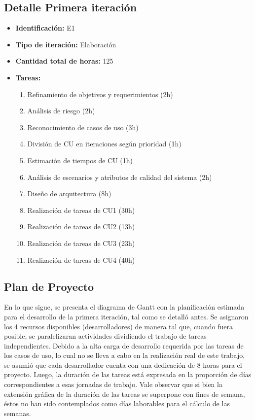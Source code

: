 \documentclass[a4paper, 10pt, twoside]{article}
\begin{document}
\subsection{Detalle Primera iteración}
\begin{itemize}
  \item \textbf{Identificación:} E1
  \item \textbf{Tipo de iteración:} Elaboración
  \item \textbf{Cantidad total de horas:} 125
  \item \textbf{Tareas:}
\begin{enumerate}
  \item Refinamiento de objetivos y requerimientos (2h)
  \item Análisis de riesgo (2h)
  \item Reconocimiento de casos de uso (3h)
  \item División de CU en iteraciones según prioridad (1h)
  \item Estimación de tiempos de CU (1h)
  \item Análisis de escenarios y atributos de calidad del sistema (2h)
  \item Diseño de arquitectura (8h)
  \item Realización de tareas de CU1 (30h)
  \item Realización de tareas de CU2 (13h)
  \item Realización de tareas de CU3 (23h)
  \item Realización de tareas de CU4 (40h)
\end{enumerate}
\end{itemize}

\subsection{Plan de Proyecto}
En lo que sigue, se presenta el diagrama de Gantt con la planificación estimada para el desarrollo de la primera iteración, tal como se detalló antes. Se asignaron los 4 recursos disponibles (desarrolladores) de manera tal que, cuando fuera posible, se paralelizaran actividades dividiendo el trabajo de tareas independientes. Debido a la alta carga de desarrollo requerida por las tareas de los casos de uso, lo cual no se lleva a cabo en la realización real de este trabajo, se asumió que cada desarrollador cuenta con una dedicación de 8 horas para el proyecto. Luego, la duración de las tareas está expresada en la proporción de días correspondientes a esas jornadas de trabajo. Vale observar que si bien la extensión gráfica de la duración de las tareas se superpone con fines de semana, éstos no han sido contemplados como días laborables para el cálculo de las semanas.
\newpage
\end{document}
